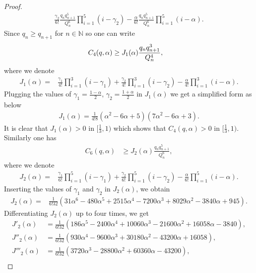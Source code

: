 \documentclass[12pt]{amsart}
\theoremstyle{definition}
\theoremstyle{plain}
\theoremstyle{definition}
\numberwithin{equation}{section}
\begin{document}
\begin{proof}
\begin{align*}
\frac{\gamma_{2}}{6!}\frac{q_{n}q_{n+1}^{5}}{Q_{n}^{6}}\displaystyle\prod_{i=1}^{5}
(i-\gamma_{2})-\frac{\alpha}{6!}\frac{q_{n}q_{n+1}^{5}}{Q_{n}^{6}}\displaystyle\prod_{i=1}^{5}(i-\alpha).
\end{align*}
Since $q_{n}\geq q_{n+1}$ for $n\in\mathbb{N}$ so one can write
\begin{align}{\label{c-4}}
C_{4}(q,\alpha)&\geq J_{1}(\alpha)\frac{q_{n}q_{n+1}^{3}}{Q_{n}^{4}},
\end{align} where we denote
\begin{align*}
J_{1}(\alpha)=&\frac{\gamma_{1}}{4!}\displaystyle\prod_{i=1}^{3}(i-\gamma_{1})+\frac{\gamma_{2}}{4!}\displaystyle
\prod_{i=1}^{3}(i-\gamma_{2})-\frac{\alpha}{4!}\displaystyle\prod_{i=1}^{3}(i-\alpha).
\end{align*}Plugging the values of $\gamma_{1}=\frac{1-\alpha}{2}$, $\gamma_{2}=\frac{1+\alpha}{2}$ in $J_{1}(\alpha)$ we get a simplified form as below
\begin{align*}
J_{1}(\alpha)=\frac{1}{4!8}(\alpha^2-6\alpha+5)(7\alpha^2-6\alpha+3).
\end{align*} It is clear that $J_1(\alpha)>0$ in $[\frac{1}{3}, 1)$ which shows that $C_{4}(q,\alpha)>0$ in $[\frac{1}{3}, 1)$.\\
Similarly one has
\begin{align}
C_{6}(q,\alpha)&\geq J_{2}(\alpha)\frac{q_{n}q_{n+1}^{5}}{Q_{n}^{6}},
\end{align}
where we denote
\begin{align*}
J_{2}(\alpha)=&\frac{\gamma_{1}}{6!}\displaystyle\prod_{i=1}^{5}(i-\gamma_{1})+\frac{\gamma_{2}}{6!}\displaystyle\prod_{i=1}^{5}
(i-\gamma_{2})-\frac{\alpha}{6!}\displaystyle\prod_{i=1}^{5}(i-\alpha).
\end{align*}Inserting the values of $\gamma_{1}$ and $\gamma_{2}$ in $J_{2}(\alpha)$, we obtain
\begin{align*}
J_{2}(\alpha)=&\frac{1}{6!32}(31\alpha^{6}-480\alpha^{5}+2515\alpha^{4}-7200\alpha^{3}+8029\alpha^{2}-3840\alpha+945).
\end{align*}Differentiating $J_{2}(\alpha)$ up to four times, we get
\begin{align*}
J'_{2}(\alpha)&=\frac{1}{6!32}(186\alpha^{5}-2400\alpha^{4}+10060\alpha^{3}-21600\alpha^{2}+16058\alpha-3840),\\
J''_{2}(\alpha)&=\frac{1}{6!32}(930\alpha^{4}-9600\alpha^{3}+30180\alpha^{2}-43200\alpha+16058),\\
J'''_{2}(\alpha)&=\frac{1}{6!32}(3720\alpha^{3}-28800\alpha^{2}+60360\alpha-43200),\\

\end{align*}
\end{proof}
\end{document}
